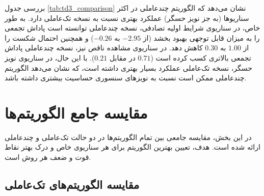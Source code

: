 بررسی جدول \ref{tab:td3_comparison} نشان می‌دهد که الگوریتم چندعاملی  در اکثر سناریوها (به جز نویز حسگر) عملکرد بهتری نسبت به نسخه تک‌عاملی دارد. به طور خاص، در سناریوی شرایط اولیه تصادفی، نسخه چندعاملی توانسته است پاداش تجمعی را به میزان قابل توجهی بهبود بخشد (از $-2.95$ به $-0.26$) و همچنین احتمال شکست را از $1.00$ به $0.30$ کاهش دهد. در سناریوی مشاهده ناقص نیز، نسخه چندعاملی پاداش تجمعی بالاتری کسب کرده است ($0.71$ در مقابل $0.21$). با این حال، در سناریوی نویز حسگر، نسخه تک‌عاملی عملکرد بسیار بهتری داشته است، که نشان می‌دهد الگوریتم  چندعاملی ممکن است نسبت به نویزهای سنسوری حساسیت بیشتری داشته باشد.

\section{مقایسه جامع الگوریتم‌ها}
\label{sec:comprehensive_comparison}

در این بخش، مقایسه جامعی بین تمام الگوریتم‌ها در دو حالت تک‌عاملی و چندعاملی ارائه شده است. هدف، تعیین بهترین الگوریتم برای هر سناریوی خاص و درک بهتر نقاط قوت و ضعف هر روش است.

\subsection{مقایسه الگوریتم‌های تک‌عاملی}

